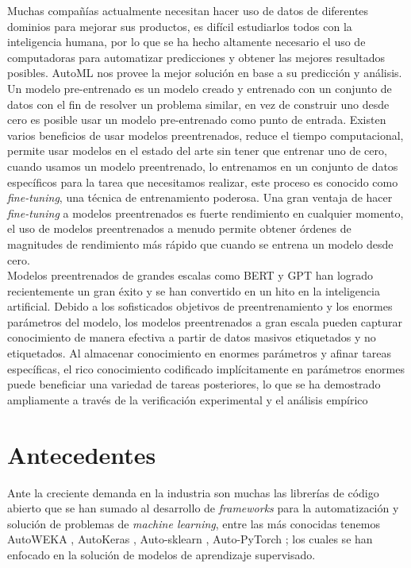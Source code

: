  Muchas compañías actualmente necesitan hacer uso de datos de diferentes dominios para mejorar sus productos, es difícil estudiarlos todos con la inteligencia humana, por lo que se ha hecho altamente necesario el uso de computadoras para automatizar predicciones y obtener las mejores resultados posibles. AutoML nos provee la mejor solución en base a su predicción y análisis.\\

Un modelo pre-entrenado \parencite{96} es un modelo creado y entrenado con un conjunto de datos con el fin de resolver un problema similar, en vez de construir uno desde cero es posible usar un modelo pre-entrenado como punto de entrada. Existen varios beneficios de usar modelos preentrenados, reduce el tiempo computacional, permite usar modelos en el estado del arte sin tener que entrenar uno de cero, cuando usamos un modelo preentrenado, lo entrenamos en un conjunto de datos específicos para la tarea que necesitamos realizar, este proceso es conocido como \textit{fine-tuning}, una técnica de entrenamiento poderosa. Una gran ventaja de hacer \textit{fine-tuning} a modelos preentrenados es fuerte rendimiento en cualquier momento, el uso de modelos preentrenados a menudo permite obtener órdenes de magnitudes de rendimiento más rápido que cuando se entrena un modelo desde cero. \\

Modelos preentrenados de grandes escalas como BERT \parencite{11} y GPT \parencite{12} han logrado recientemente un gran éxito y se han convertido en un hito en la inteligencia artificial. Debido a los sofisticados objetivos de preentrenamiento y los enormes parámetros del modelo, los modelos preentrenados a gran escala pueden capturar conocimiento de manera efectiva a partir de datos masivos etiquetados y no etiquetados. Al almacenar conocimiento en enormes parámetros y afinar tareas específicas, el rico conocimiento codificado implícitamente en parámetros enormes puede beneficiar una variedad de tareas posteriores, lo que se ha demostrado ampliamente a través de la verificación experimental y el análisis empírico \\

\section*{Antecedentes}
Ante la creciente demanda en la industria son muchas las librerías de código abierto que se han sumado al desarrollo de \textit{frameworks} para la automatización y solución de problemas de \textit{machine learning}, entre las más conocidas tenemos AutoWEKA \parencite{13}, AutoKeras \parencite{14}, Auto-sklearn \parencite{15}, Auto-PyTorch \parencite{16}; los cuales se han enfocado en la solución de modelos de aprendizaje supervisado.\\

